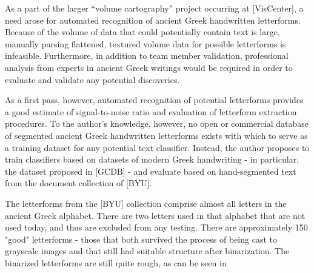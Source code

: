 \documentclass[10pt,twocolumn,letterpaper]{article}
\begin{document}
As a part of the larger “volume cartography” project occurring at [VisCenter], a need arose for automated recognition of ancient Greek handwritten letterforms.  Because of the volume of data that could potentially contain text is large, manually parsing flattened, textured volume data for possible letterforms is infeasible. Furthermore, in addition to team member validation, professional analysis from experts in ancient Greek writings would be required in order to evaluate and validate any potential discoveries.

As a first pass, however, automated recognition of potential letterforms provides a good estimate of signal-to-noise ratio and evaluation of letterform extraction procedures. To the author’s knowledge, however, no open or commercial database of segmented ancient Greek handwritten letterforms exists with which to serve as a training dataset for any potential text classifier. Instead, the author proposes to train classifiers based on datasets of modern Greek handwriting - in particular, the dataset proposed in [GCDB] - and evaluate based on hand-segmented text from the document collection of [BYU].

The letterforms from the [BYU] collection comprise almost all letters in the ancient Greek alphabet. There are two letters used in that alphabet that are not used today, and thus are excluded from any testing. There are approximately 150 "good" letterforms - those that both survived the process of being cast to grayscale images and that still had suitable structure after binarization. The binarized letterforms are still quite rough, as can be seen in \label{fig:AGbin}
\end{document}
